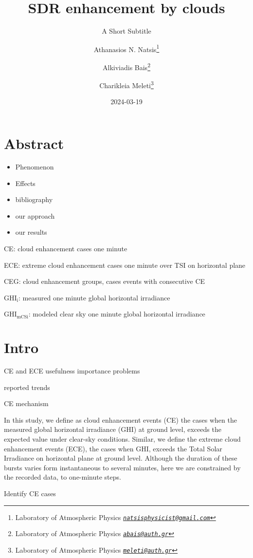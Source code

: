 \documentclass[
]{article}
\title{SDR enhancement by clouds}
\subtitle{A Short Subtitle}
\author{Athanasios N. Natsis\footnote{Laboratory of Atmospheric Physics \emph{\href{mailto:natsisphysicist@gmail.com}{\nolinkurl{natsisphysicist@gmail.com}}}} \and Alkiviadis Bais\footnote{Laboratory of Atmospheric Physics \emph{\href{mailto:abais@auth.gr}{\nolinkurl{abais@auth.gr}}}} \and Charikleia Meleti\footnote{Laboratory of Atmospheric Physics \emph{\href{mailto:meleti@auth.gr}{\nolinkurl{meleti@auth.gr}}}}}
\date{2024-03-19}
\providecommand{\tightlist}{%
  \setlength{\itemsep}{0pt}\setlength{\parskip}{0pt}}
\begin{document}
\maketitle

{
\setcounter{tocdepth}{4}
\tableofcontents
}
\hypertarget{abstract}{%
\section*{Abstract}\label{abstract}}

\begin{itemize}
\tightlist
\item
  Phenomenon
\item
  Effects
\item
  bibliography
\item
  our approach
\item
  our results
\end{itemize}

CE: cloud enhancement cases one minute

ECE: extreme cloud enhancement cases one minute over TSI on horizontal plane

CEG: cloud enhancement groups, cases events with consecutive CE

\(\text{GHI}_\text{i}\): measured one minute global horizontal irradiance

\(\text{GHI}_\text{mCSi}\): modeled clear sky one minute global horizontal irradiance

\hypertarget{intro}{%
\section{Intro}\label{intro}}

CE and ECE usefulness
importance
problems

reported trends

CE mechanism

In this study, we define as cloud enhancement events (CE) the cases when the measured
global horizontal irradiance (GHI) at ground level, exceeds the expected value under
clear-sky conditions.
Similar, we define the extreme cloud enhancement events (ECE), the cases when GHI,
exceeds the Total Solar Irradiance on horizontal plane at ground level.
Although the duration of these bursts varies form instantaneous to several minutes,
here we are constrained by the recorded data, to one-minute steps.

Identify CE cases
\end{document}
